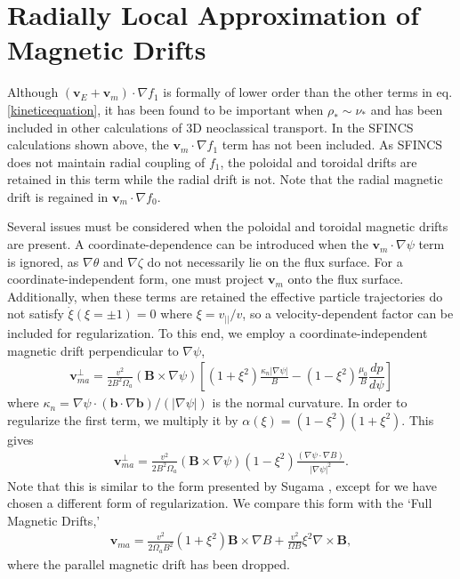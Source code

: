 \documentclass{article}
\numberwithin{figure}{section}
\numberwithin{equation}{section}
\newcommand{\der}[2]{\dfrac{d #1}{d  #2}}
\begin{document}
\FloatBarrier

\section{Radially Local Approximation of Magnetic Drifts}\label{mds}
Although $(\bm{v}_E + \bm{v}_m) \cdot \nabla f_1$ is formally of lower order than the other terms in eq. \ref{kineticequation}, it has been found to be important when $\rho_* \sim \nu_*$ and has been included in other calculations of 3D neoclassical transport. In the SFINCS calculations shown above, the $\bm{v}_m \cdot \nabla f_1$ term has not been included. As SFINCS does not maintain radial coupling of $f_1$, the poloidal and toroidal drifts are retained in this term while the radial drift is not. Note that the radial magnetic drift is regained in $\bm{v}_m \cdot \nabla f_0$. 

Several issues must be considered when the poloidal and toroidal magnetic drifts are present. A coordinate-dependence can be introduced when the $\bm{v}_m \cdot \nabla \psi$ term is ignored, as $\nabla \theta$ and $\nabla \zeta$ do not necessarily lie on the flux surface. For a coordinate-independent form, one must project $\bm{v}_m$ onto the flux surface. Additionally, when these terms are retained the effective particle trajectories do not satisfy $\dot{\xi} (\xi = \pm 1) = 0$ where $\xi = v_{||}/v$, so a velocity-dependent factor can be included for regularization. To this end, we employ a coordinate-independent magnetic drift perpendicular to $\nabla \psi$,
\begin{gather}
\bm{v}_{ma}^{\perp} = \frac{v^2}{2B^2 \Omega_a} (\bm{B} \times \nabla \psi) \left[(1+\xi^2) \frac{\kappa_n \rvert \nabla \psi \rvert}{B} - (1 - \xi^2) \frac{\mu_0}{B} \der{p}{\psi} \right] 
\end{gather}
where $\kappa_n = \nabla \psi \cdot (\bm{b} \cdot \nabla \bm{b})/(\rvert \nabla \psi \rvert)$ is the normal curvature. In order to regularize the first term, we multiply it by $\alpha(\xi) = (1-\xi^2)(1+\xi^2)$. This gives
\begin{gather}
\bm{v}_{ma}^{\perp} = \frac{v^2}{2B^2 \Omega_a} (\bm{B} \times \nabla \psi) (1 - \xi^2) \frac{(\nabla \psi \cdot \nabla B)}{\rvert \nabla \psi \rvert^2}.
\end{gather}
Note that this is similar to the form presented by Sugama \cite{Sugama2016}, except for we have chosen a different form of regularization. We compare this form with the `Full Magnetic Drifts,' 
\begin{gather}
\bm{v}_{ma} = \frac{v^2}{2 \Omega_a B^2} (1 + \xi^2) \bm{B} \times \nabla B + \frac{v^2}{\Omega B} \xi^2 \nabla \times \bm{B},
\end{gather}
where the parallel magnetic drift has been dropped. 
\end{document}
